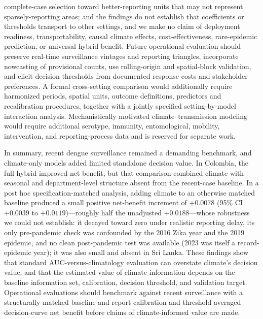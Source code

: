 \documentclass[11pt,a4paper]{article}
\begin{document}
complete-case selection toward better-reporting units that may not represent sparsely-reporting areas; and the findings do not establish that coefficients or thresholds transport to other settings, and we make no claim of deployment readiness, transportability, causal climate effects, cost-effectiveness, rare-epidemic prediction, or universal hybrid benefit. Future operational evaluation should preserve real-time surveillance vintages and reporting triangles, incorporate nowcasting of provisional counts, use rolling-origin and spatial-block validation, and elicit decision thresholds from documented response costs and stakeholder preferences. A formal cross-setting comparison would additionally require harmonized periods, spatial units, outcome definitions, predictors and recalibration procedures, together with a jointly specified setting-by-model interaction analysis. Mechanistically motivated climate--transmission modeling would require additional serotype, immunity, entomological, mobility, intervention, and reporting-process data and is reserved for separate work.

In summary, recent dengue surveillance remained a demanding benchmark, and climate-only models added limited standalone decision value. In Colombia, the full hybrid improved net benefit, but that comparison combined climate with seasonal and department-level structure absent from the recent-case baseline. In a post hoc specification-matched analysis, adding climate to an otherwise matched baseline produced a small positive net-benefit increment of $+0.0078$ (95\% CI $+0.0039$ to $+0.0119$)---roughly half the unadjusted $+0.0188$---whose robustness we could not establish: it decayed toward zero under realistic reporting delay, its only pre-pandemic check was confounded by the 2016 Zika year and the 2019 epidemic, and no clean post-pandemic test was available (2023 was itself a record-epidemic year); it was also small and absent in Sri Lanka. These findings show that standard AUC-versus-climatology evaluation can overstate climate's decision value, and that the estimated value of climate information depends on the baseline information set, calibration, decision threshold, and validation target. Operational evaluations should benchmark against recent surveillance with a structurally matched baseline and report calibration and threshold-averaged decision-curve net benefit before claims of climate-informed value are made.

\end{document}
